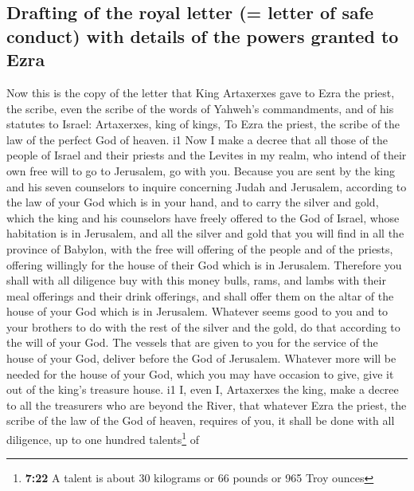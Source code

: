 \hypertarget{drafting-of-the-royal-letter-letter-of-safe-conduct-with-details-of-the-powers-granted-to-ezra}{%
\subsection{Drafting of the royal letter (= letter of safe conduct) with
details of the powers granted to
Ezra}\label{drafting-of-the-royal-letter-letter-of-safe-conduct-with-details-of-the-powers-granted-to-ezra}}

 Now this is the copy of the letter that King Artaxerxes
gave to Ezra the priest, the scribe, even the scribe of the words of
Yahweh's commandments, and of his statutes to Israel: 
Artaxerxes, king of kings, To Ezra the priest, the scribe of the law of
the perfect God of heaven. i1 Now  I make a decree that
all those of the people of Israel and their priests and the Levites in
my realm, who intend of their own free will to go to Jerusalem, go with
you.  Because you are sent by the king and his seven
counselors to inquire concerning Judah and Jerusalem, according to the
law of your God which is in your hand,  and to carry the
silver and gold, which the king and his counselors have freely offered
to the God of Israel, whose habitation is in Jerusalem, 
and all the silver and gold that you will find in all the province of
Babylon, with the free will offering of the people and of the priests,
offering willingly for the house of their God which is in Jerusalem.
 Therefore you shall with all diligence buy with this
money bulls, rams, and lambs with their meal offerings and their drink
offerings, and shall offer them on the altar of the house of your God
which is in Jerusalem.  Whatever seems good to you and to
your brothers to do with the rest of the silver and the gold, do that
according to the will of your God.  The vessels that are
given to you for the service of the house of your God, deliver before
the God of Jerusalem.  Whatever more will be needed for
the house of your God, which you may have occasion to give, give it out
of the king's treasure house. i1  I, even I, Artaxerxes
the king, make a decree to all the treasurers who are beyond the River,
that whatever Ezra the priest, the scribe of the law of the God of
heaven, requires of you, it shall be done with all diligence,
 up to one hundred talents\footnote{\textbf{7:22} A
  talent is about 30 kilograms or 66 pounds or 965 Troy ounces} of
